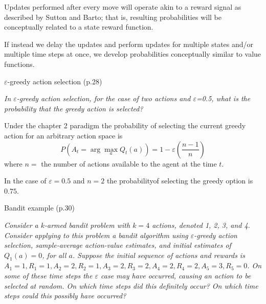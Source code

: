 \documentclass[12pt,letterpaper]{exam}
\newcommand\chapter{1}
\begin{document}
\begin{questions}
	\begin{solution}
		Updates performed after every move will operate akin to a reward signal as described
		by Sutton and Barto; that is, resulting probabilities will be conceptually related to 
		a state reward function.

		If instead we delay the updates and perform updates for multiple states and/or 
		multiple time steps at once, we develop probabilities conceptually similar to value functions.
	\end{solution}
	

	\renewcommand\chapter{2}


	\question%
	$\varepsilon$-greedy action selection (p.28)
	
	\emph{In $\varepsilon$-greedy action selection, for the case of two actions and $\varepsilon$=0.5, 
	what is the probability that the greedy action is selected?}

	\begin{solution}
		Under the chapter 2 paradigm the probability of selecting the current greedy 
		action for an arbitrary action space is
		\[
			P\left(A_t= \arg\max_a Q_t(a) \right) = 
			1 - \varepsilon\left(\frac{n-1}{n}\right)
		\]
		where \(n=\) the number of actions available to the agent at the time \(t\).
		
		In the case of \(\varepsilon=0.5\) and \(n=2\)
		the probabilityof selecting the greedy option is \(0.75\).
	\end{solution}
	
	\question%
	Bandit example (p.30)
	
	\emph{Consider a $k$-armed bandit problem with $k = 4$ actions, denoted 1, 2, 3, and 4. 
	Consider applying to this problem a bandit algorithm using $\varepsilon$-greedy action selection, 
	sample-average action-value estimates, and initial estimates of $Q_1(a) = 0$, for all $a$. 
	Suppose the initial sequence of actions and rewards is 
	\(A_1 = 1, R_1 = 1, 
	A_2 = 2, R_2 = 1, 
	A_3 = 2, R_3 = 2, 
	A_4 = 2, R_4 = 2, 
	A_5 = 3, R_5 = 0\). 
	On some of these time steps the $\varepsilon$ case may have occurred, causing an action to be selected at random. 
	On which time steps did this definitely occur? On which time steps could this possibly have occurred?}


\end{questions}
\end{document}

